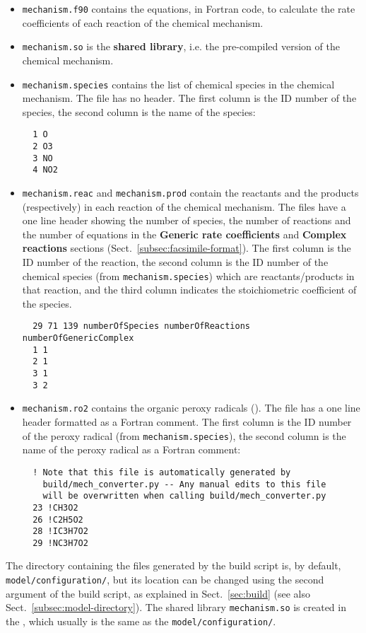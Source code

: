 \begin{itemize}
\item \texttt{mechanism.f90} contains the equations, in Fortran code,
  to calculate the rate coefficients of each reaction of the chemical
  mechanism.
\item \texttt{mechanism.so} is the \textbf{shared library}, i.e. the
  pre-compiled version of the chemical mechanism.
\item \texttt{mechanism.species} contains the list of chemical species
  in the chemical mechanism. The file has no header. The first column
  is the ID number of the species, the second column is the
  name of the species:
  \begin{verbatim}
  1 O
  2 O3
  3 NO
  4 NO2
  \end{verbatim}
\item \texttt{mechanism.reac} and \texttt{mechanism.prod} contain the
  reactants and the products (respectively) in each reaction of the
  chemical mechanism. The files have a one line header showing the
  number of species, the number of reactions and the number of
  equations in the \textbf{Generic rate coefficients} and
  \textbf{Complex reactions} sections (Sect.~\ref{subsec:facsimile-format}).
  The first column is the ID number of the reaction, the second
  column is the ID number of the chemical species (from
  \texttt{mechanism.species}) which are reactants/products in that
  reaction, and the third column indicates the stoichiometric coefficient of the species.
  \begin{verbatim}
  29 71 139 numberOfSpecies numberOfReactions numberOfGenericComplex
  1 1
  2 1
  3 1
  3 2
  \end{verbatim}
\item \texttt{mechanism.ro2} contains the organic peroxy radicals
  (). The file has a one line header formatted as a Fortran
  comment. The first column is the ID number of the peroxy
  radical (from \texttt{mechanism.species}), the second column is the
  name of the peroxy radical as a Fortran comment:
  \begin{verbatim}
  ! Note that this file is automatically generated by
    build/mech_converter.py -- Any manual edits to this file
    will be overwritten when calling build/mech_converter.py
  23 !CH3O2
  26 !C2H5O2
  28 !IC3H7O2
  29 !NC3H7O2
  \end{verbatim}
\end{itemize}

The directory containing the files generated by the build script is,
by default, \texttt{model/configuration/}, but its location can be
changed using the second argument of the build script, as explained in
Sect.~\ref{sec:build} (see also Sect.~\ref{subsec:model-directory}).
The shared library \texttt{mechanism.so} is created in the \sharedir,
which usually is the same as the \texttt{model/configuration/}.

